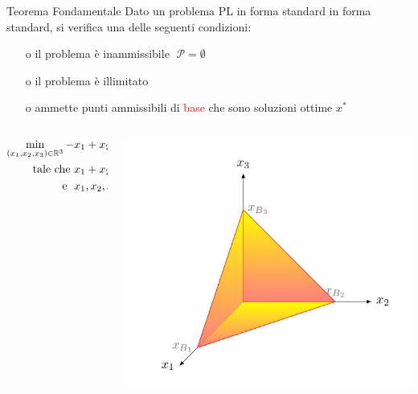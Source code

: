 \begin{frame}[t]{\textrm{Teorema Fondamentale}}
	Dato un problema PL in forma standard in forma standard, si verifica una delle seguenti condizioni:\pause
\begin{itemize}
\item[o] il problema è inammissibile $\;\mathcal{P}=\emptyset$\pause
\item[o] il problema è illimitato\pause
\item[o] ammette punti ammissibili di  \textcolor{red}{base} che sono soluzioni ottime $x^{*}$
\end{itemize}
\pause
\begin{columns}
\begin{column}{0.4\textwidth}
\begin{align*}
\min\limits_{(x_{1},x_{2},x_{3})\in\mathbb{R}^{3}} -&x_{1}+ x_{2}-4x_{3}\\
\text{tale che    }&x_{1}+x_{2}+x_{3}=1,\\
\text{\; e   \;} &x_{1}, x_{2}, x_{3} \geq 0
\end{align*}
\end{column}
\pause
\begin{column}{0.4\textwidth}
	\includegraphics[width=\columnwidth]{Feas.jpg}
\end{column}
\end{columns}
\end{frame}


